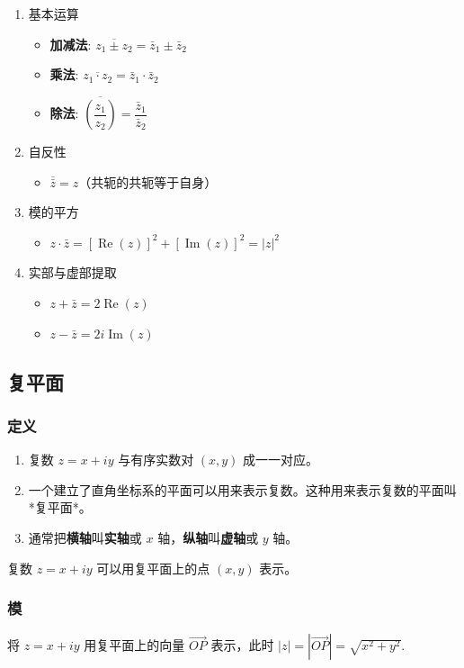 \begin{enumerate}
\item 基本运算
\begin{itemize}
\item \textbf{加减法}: \(\overline{z_{1} \pm z_{2}} = \bar{z}_{1} \pm \bar{z}_{2}\)
\item \textbf{乘法}: \(\overline{z_{1} \cdot z_{2}} = \bar{z}_{1} \cdot \bar{z}_{2}\)
\item \textbf{除法}: \(\overline{\left(\dfrac{z_{1}}{z_{2}}\right)} = \dfrac{\bar{z}_{1}}{\bar{z}_{2}}\)
\end{itemize}
\item 自反性
\begin{itemize}
\item \(\overline{\bar{z}} = z\)（共轭的共轭等于自身）
\end{itemize}
\item 模的平方
\begin{itemize}
\item \(z \cdot \bar{z} = [\operatorname{Re}(z)]^{2} + [\operatorname{Im}(z)]^{2} = |z|^2\)
\end{itemize}
\item 实部与虚部提取
\begin{itemize}
\item \(z + \bar{z} = 2\operatorname{Re}(z)\)
\item \(z - \bar{z} = 2i\operatorname{Im}(z)\)
\end{itemize}
\end{enumerate}
\subsection{复平面}
\label{复平面}
\subsubsection{定义}
\label{定义}
\begin{enumerate}
\item 复数 \(z = x + iy\) 与有序实数对 \((x, y)\) 成一一对应。
\item 一个建立了直角坐标系的平面可以用来表示复数。这种用来表示复数的平面叫*复平面*。
\item 通常把\textbf{横轴}叫\textbf{实轴}或 \(x\) 轴，\textbf{纵轴}叫\textbf{虚轴}或 \(y\) 轴。
\end{enumerate}

复数 \(z = x + iy\) 可以用复平面上的点 \((x, y)\) 表示。
\subsubsection{模}
\label{模}
将 \(z = x + iy\) 用复平面上的向量 \(\overrightarrow{OP}\) 表示，此时
\(|z|=\left|\overrightarrow{OP}\right|=\sqrt{x^2+y^2}.\)

